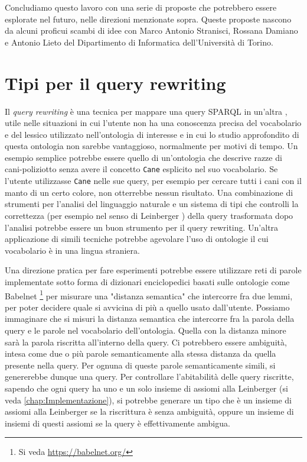 Concludiamo questo lavoro con una serie di proposte che potrebbero essere esplorate nel futuro, nelle direzioni menzionate sopra. Queste proposte 
nascono da alcuni proficui scambi di idee con Marco Antonio Stranisci, Rossana Damiano e Antonio Lieto del Dipartimento di Informatica dell'Università 
di Torino.

\section{Tipi per il query rewriting}
Il \textit{query rewriting} è una tecnica per mappare una query SPARQL in un'altra \cite{fQuery}, utile nelle situazioni in cui l'utente non ha una conoscenza precisa del vocabolario e 
del lessico utilizzato nell'ontologia di interesse e in cui lo studio approfondito di questa ontologia non sarebbe vantaggioso, normalmente per motivi di tempo. Un esempio semplice potrebbe essere quello di un'ontologia che descrive razze di cani-poliziotto senza avere il concetto \texttt{Cane} esplicito nel suo vocabolario.
Se l'utente utilizzasse \texttt{Cane} nelle sue query, per esempio per cercare tutti i cani con il manto di un certo colore, non otterrebbe nessun risultato. Una combinazione di strumenti per l'analisi del linguaggio naturale e un sistema di tipi che controlli la correttezza (per esempio nel senso di Leinberger \cite{leinbergerphdthesis}) della query trasformata  dopo l'analisi potrebbe essere un buon strumento per il query rewriting. Un'altra applicazione di simili tecniche potrebbe agevolare l'uso di ontologie il cui vocabolario è in una lingua straniera.

Una direzione pratica per fare esperimenti potrebbe essere utilizzare reti di parole implementate sotto forma di dizionari enciclopedici 
basati sulle ontologie come Babelnet \footnote{Si veda \url{https://babelnet.org/}} per misurare una "distanza semantica"  che intercorre fra due lemmi, per poter decidere quale si avvicina di più a quello usato dall'utente. Possiamo immaginare che si misuri la distanza semantica che intercorre fra la parola della 
query e le parole nel vocabolario dell'ontologia. Quella con la distanza minore sarà la parola riscritta all'interno della query. Ci potrebbero essere 
ambiguità, intesa come due o più parole semanticamente alla stessa distanza da quella presente nella query. Per ognuna di queste parole semanticamente 
simili, si genererebbe dunque una query.
Per controllare l'abitabilità delle query riscritte, sapendo che ogni query ha uno e un solo insieme di assiomi alla Leinberger (si veda \autoref{chap:Implementazione}), si potrebbe generare un tipo che è un insieme di assiomi alla Leinberger se la riscrittura è senza ambiguità, oppure un insieme di insiemi di questi assiomi se la query è effettivamente ambigua.

